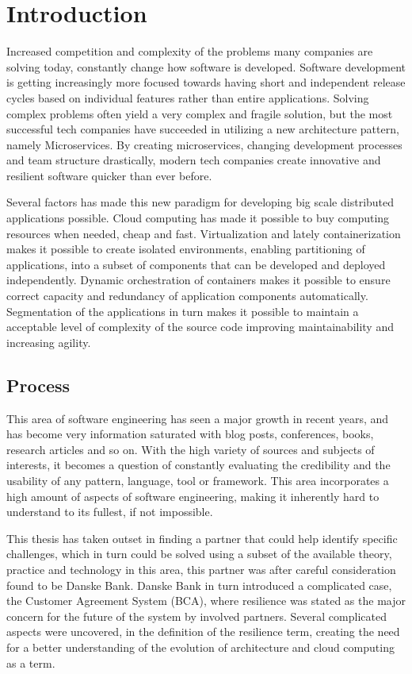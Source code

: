 \chapter{Introduction}
\label{ch:introduction}
Increased competition and complexity of the problems many companies are solving today, constantly change how software is developed. Software development is getting increasingly more focused towards having short and independent release cycles based on individual features rather than entire applications. Solving complex problems often yield a very complex and fragile solution, but the most successful tech companies have succeeded in utilizing a new architecture pattern, namely Microservices. By creating microservices, changing development processes and team structure drastically, modern tech companies create innovative and resilient software quicker than ever before.

Several factors has made this new paradigm for developing big scale distributed applications possible. Cloud computing has made it possible to buy computing resources when needed, cheap and fast. Virtualization and lately containerization makes it possible to create isolated environments, enabling partitioning of applications, into a subset of components that can be developed and deployed independently. Dynamic orchestration of containers makes it possible to ensure correct capacity and redundancy of application components automatically. Segmentation of the applications in turn makes it possible to maintain a acceptable level of complexity of the source code improving maintainability and increasing agility.

\section{Process}
This area of software engineering has seen a major growth in recent years, and has become very information saturated with blog posts, conferences, books, research articles and so on. With the high variety of sources and subjects of interests, it becomes a question of constantly evaluating the credibility and the usability of any pattern, language, tool or framework. This area incorporates a high amount of aspects of software engineering, making it inherently hard to understand to its fullest, if not impossible. 

This thesis has taken outset in finding a partner that could help identify specific challenges, which in turn could be solved using a subset of the available theory, practice and technology in this area, this partner was after careful consideration found to be Danske Bank. Danske Bank in turn introduced a complicated case, the Customer Agreement System (BCA), where resilience was stated as the major concern for the future of the system by involved partners. Several complicated aspects were uncovered, in the definition of the resilience term, creating the need for a better understanding of the evolution of architecture and cloud computing as a term.

